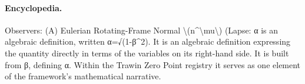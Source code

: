 \paragraph{Encyclopedia.}
Observers: (A) Eulerian Rotating-Frame Normal \textbackslash{}(n\textasciicircum{}\textbackslash{}mu\textbackslash{}) (Lapse: α is an algebraic definition, written α=√(1-β\textasciicircum{}2). It is an algebraic definition expressing the quantity directly in terms of the variables on its right-hand side. It is built from β, defining α. Within the Trawin Zero Point registry it serves as one element of the framework's mathematical narrative.
